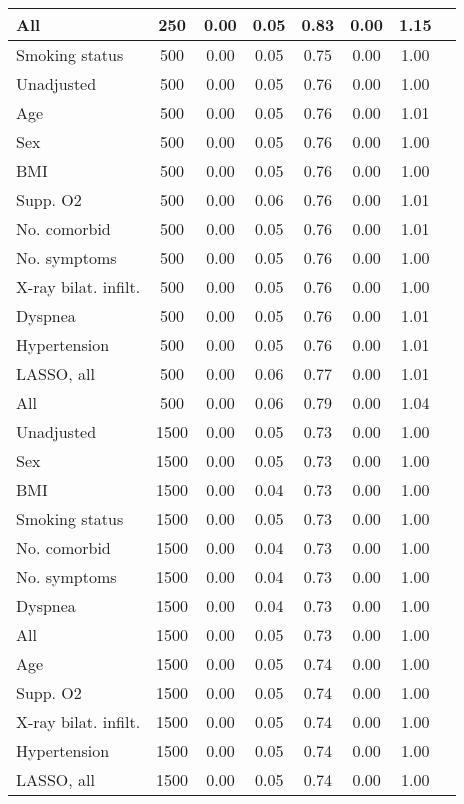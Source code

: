 \documentclass{article}
\begin{document}
{\begin{longtable}{lccccccc}
All & 250 & 0.00 & 0.05 & 0.83 & 0.00 & 1.15 \\ \midrule 
Smoking status & 500 & 0.00 & 0.05 & 0.75 & 0.00 & 1.00 \\ 
Unadjusted & 500 & 0.00 & 0.05 & 0.76 & 0.00 & 1.00 \\ 
Age & 500 & 0.00 & 0.05 & 0.76 & 0.00 & 1.01 \\ 
Sex & 500 & 0.00 & 0.05 & 0.76 & 0.00 & 1.00 \\ 
BMI & 500 & 0.00 & 0.05 & 0.76 & 0.00 & 1.00 \\ 
Supp. O2 & 500 & 0.00 & 0.06 & 0.76 & 0.00 & 1.01 \\ 
No. comorbid & 500 & 0.00 & 0.05 & 0.76 & 0.00 & 1.01 \\ 
No. symptoms & 500 & 0.00 & 0.05 & 0.76 & 0.00 & 1.00 \\ 
X-ray bilat. infilt. & 500 & 0.00 & 0.05 & 0.76 & 0.00 & 1.00 \\ 
Dyspnea & 500 & 0.00 & 0.05 & 0.76 & 0.00 & 1.01 \\ 
Hypertension & 500 & 0.00 & 0.05 & 0.76 & 0.00 & 1.01 \\ 
LASSO, all & 500 & 0.00 & 0.06 & 0.77 & 0.00 & 1.01 \\ 
All & 500 & 0.00 & 0.06 & 0.79 & 0.00 & 1.04 \\ \midrule 
Unadjusted & 1500 & 0.00 & 0.05 & 0.73 & 0.00 & 1.00 \\ 
Sex & 1500 & 0.00 & 0.05 & 0.73 & 0.00 & 1.00 \\ 
BMI & 1500 & 0.00 & 0.04 & 0.73 & 0.00 & 1.00 \\ 
Smoking status & 1500 & 0.00 & 0.05 & 0.73 & 0.00 & 1.00 \\ 
No. comorbid & 1500 & 0.00 & 0.04 & 0.73 & 0.00 & 1.00 \\ 
No. symptoms & 1500 & 0.00 & 0.04 & 0.73 & 0.00 & 1.00 \\ 
Dyspnea & 1500 & 0.00 & 0.04 & 0.73 & 0.00 & 1.00 \\ 
All & 1500 & 0.00 & 0.05 & 0.73 & 0.00 & 1.00 \\ 
Age & 1500 & 0.00 & 0.05 & 0.74 & 0.00 & 1.00 \\ 
Supp. O2 & 1500 & 0.00 & 0.05 & 0.74 & 0.00 & 1.00 \\ 
X-ray bilat. infilt. & 1500 & 0.00 & 0.05 & 0.74 & 0.00 & 1.00 \\ 
Hypertension & 1500 & 0.00 & 0.05 & 0.74 & 0.00 & 1.00 \\ 
LASSO, all & 1500 & 0.00 & 0.05 & 0.74 & 0.00 & 1.00 \\
\bottomrule
\hline
\end{longtable}
}
\end{document}
